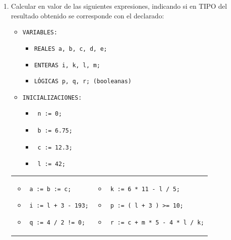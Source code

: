 \documentclass[a4paper,10pt]{article}
\begin{document}
\begin{enumerate}
\item Calcular en valor de las siguientes expresiones, indicando si en TIPO del resultado obtenido se corresponde con el declarado:
    \begin{itemize}
        \item[]	\verb=VARIABLES:=
            \begin{itemize}
                \item[]	\verb=REALES a, b, c, d, e;=
                \item[] \verb=ENTERAS i, k, l, m;=
                \item[] \verb=LÓGICAS p, q, r; (booleanas)=
            \end{itemize}
        \item[] \verb=INICIALIZACIONES:=
            \begin{itemize}
                \item[] \begin{verbatim} n := 0;\end{verbatim}
                \item[] \begin{verbatim} b := 6.75;\end{verbatim}
                \item[] \begin{verbatim} c := 12.3;\end{verbatim}
                \item[] \begin{verbatim} l := 42;\end{verbatim}
            \end{itemize}
    \end{itemize}
\begin{tabular}{p{} p{}}
    \begin{itemize}
        \item[a-] \begin{verbatim} a := b := c;\end{verbatim}
        \item[c-] \begin{verbatim} i := l + 3 - 193;\end{verbatim}
        \item[e-] \begin{verbatim} q := 4 / 2 != 0;\end{verbatim}
    \end{itemize}
&
    \begin{itemize}
        \item[b-] \begin{verbatim} k := 6 * 11 - l / 5;\end{verbatim}
        \item[d-] \begin{verbatim} p := ( l + 3 ) >= 10;\end{verbatim}
         \item[f-] \begin{verbatim} r := c + m * 5 - 4 * l / k;\end{verbatim}
    \end{itemize}
\\
\end{tabular}    


\end{enumerate}
\end{document}
